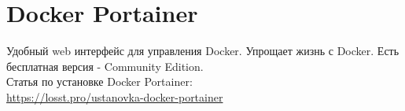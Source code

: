 \section{Docker Portainer}

Удобный web интерфейс для управления Docker. Упрощает жизнь с Docker.
Есть бесплатная версия - Community Edition. \\

\noindent Статья по установке Docker Portainer: \\
\href{https://losst.pro/ustanovka-docker-portainer}{https://losst.pro/ustanovka-docker-portainer}